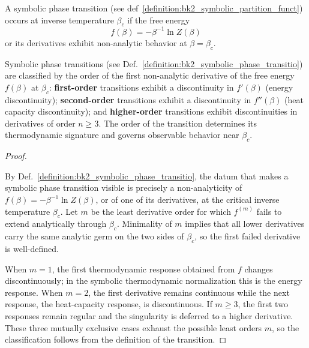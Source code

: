 \begin{definition} 
\label{definition:bk2_symbolic_phase_transitio} 
A symbolic phase transition (see def~\ref{definition:bk2_symbolic_partition_funct}) occurs at inverse temperature $\beta_c$ if the free energy
\[
f(\beta) = -\beta^{-1} \ln Z(\beta)
\]
or its derivatives exhibit non-analytic behavior at $\beta = \beta_c$.
\end{definition}
\begin{theorem} 
\label{theorem:bk2_classification_symb_phase_transitions} 
Symbolic phase transitions (see Def.~\ref{definition:bk2_symbolic_phase_transitio}) are classified
by the order of the first non-analytic derivative of the free energy $f(\beta)$ at $\beta_c$:
\textbf{first-order} transitions exhibit a discontinuity in $f'(\beta)$ (energy discontinuity);
\textbf{second-order} transitions exhibit a discontinuity in $f''(\beta)$ (heat capacity discontinuity);
and \textbf{higher-order} transitions exhibit discontinuities in derivatives of order $n \geq 3$.
The order of the transition determines its thermodynamic signature and governs observable behavior near $\beta_c$.
\end{theorem}

\begin{proof}
\label{proof:bk2_classification_symb_phase_transitions}
\leavevmode

By Def.~\ref{definition:bk2_symbolic_phase_transitio}, the datum that makes a
symbolic phase transition visible is precisely a non-analyticity of
$f(\beta)=-\beta^{-1}\ln Z(\beta)$, or of one of its derivatives, at the critical
inverse temperature $\beta_c$. Let $m$ be the least derivative order for which
$f^{(m)}$ fails to extend analytically through $\beta_c$. Minimality of $m$
implies that all lower derivatives carry the same analytic germ on the two sides
of $\beta_c$, so the first failed derivative is well-defined.

When $m=1$, the first thermodynamic response obtained from $f$ changes
discontinuously; in the symbolic thermodynamic normalization this is the energy
response. When $m=2$, the first derivative remains continuous while the next
response, the heat-capacity response, is discontinuous. If $m\geq 3$, the first
two responses remain regular and the singularity is deferred to a higher
derivative. These three mutually exclusive cases exhaust the possible least
orders $m$, so the classification follows from the definition of the transition.
\end{proof}

